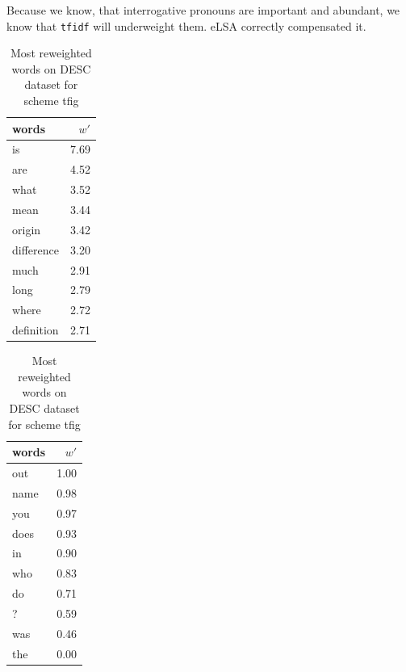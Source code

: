     Because we know, that interrogative pronouns are important and abundant, we know that \texttt{tfidf} will underweight them.
    eLSA correctly compensated it.
    
    

\begin{table}[H]
    \centering
    \begin{minipage}{.4\linewidth}
      \centering
        \begin{tabular}{lr}
\toprule
      words &  $w'$ \\
\midrule
         is &  7.69 \\
        are &  4.52 \\
       what &  3.52 \\
       mean &  3.44 \\
     origin &  3.42 \\
 difference &  3.20 \\
       much &  2.91 \\
       long &  2.79 \\
      where &  2.72 \\
 definition &  2.71 \\
\bottomrule
\end{tabular}

    \end{minipage}
    \begin{minipage}{.4\linewidth}
      \centering
        \begin{tabular}{lr}
\toprule
words &  $w'$ \\
\midrule
  out &  1.00 \\
 name &  0.98 \\
  you &  0.97 \\
 does &  0.93 \\
   in &  0.90 \\
  who &  0.83 \\
   do &  0.71 \\
    ? &  0.59 \\
  was &  0.46 \\
  the &  0.00 \\
\bottomrule
\end{tabular}

    \end{minipage} 
    \caption{Most reweighted words on DESC dataset for scheme tfig}
    \label{tab:words:TREC:tfig}
\end{table}

